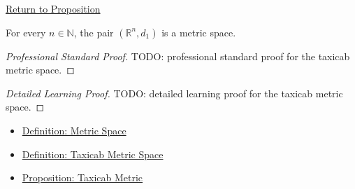 \newpage
{}
\label{prf:taxicab-metric-space-instance}

\begin{remark*}[Return]
\hyperref[prop:taxicab-metric-space-instance]{Return to Proposition}
\end{remark*}

\begin{proposition*}
For every \(n\in\mathbb{N}\), the pair \((\mathbb{R}^n,d_1)\) is a metric
space.
\end{proposition*}

\begin{proof}[Professional Standard Proof]
\LRAProofBodyStart
TODO: professional standard proof for the taxicab metric space.
\end{proof}

\begin{proof}[Detailed Learning Proof]
\LRAProofBodyStart
TODO: detailed learning proof for the taxicab metric space.
\end{proof}

\begin{remark*}
\end{remark*}

\begin{dependencies}
\begin{itemize}
  \item \hyperref[def:metric-space]{Definition: Metric Space}
  \item \hyperref[def:taxicab-metric-space]{Definition: Taxicab Metric Space}
  \item \hyperref[prop:taxicab-metric-rn]{Proposition: Taxicab Metric}
\end{itemize}
\end{dependencies}

\clearpage
